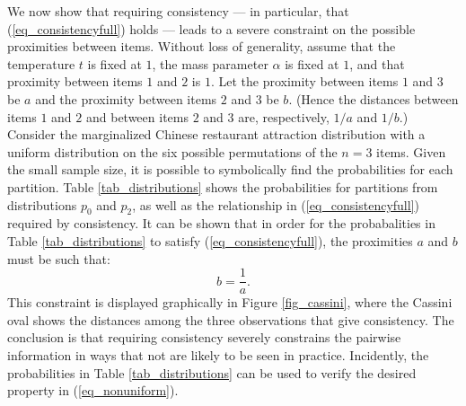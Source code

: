 \documentclass[lineno]{biometrika-dbd}
\newcommand{\mass}{\alpha}
\begin{document}
We now show that requiring consistency --- in particular, that
(\ref{eq_consistencyfull}) holds --- leads to a severe constraint on the
possible proximities between items.  Without loss of generality, assume that
the temperature $t$ is fixed at $1$, the mass parameter $\mass$ is fixed at
$1$, and that proximity between items $1$ and $2$ is $1$. Let the proximity
between items $1$ and $3$ be $a$ and the proximity between items $2$ and $3$ be
$b$.  (Hence the distances between items $1$ and $2$ and between items $2$ and
$3$ are, respectively, $1/a$ and $1/b$.) Consider the marginalized Chinese
restaurant attraction distribution with a uniform distribution on the six
possible permutations of the $n=3$ items.  Given the small sample size, it is
possible to symbolically find the probabilities for each partition.  Table
\ref{tab_distributions} shows the probabilities for partitions from
distributions $p_0$ and $p_2$, as well as the relationship in
(\ref{eq_consistencyfull}) required by consistency.  It can be shown that in
order for the probabalities in Table \ref{tab_distributions} to satisfy
(\ref{eq_consistencyfull}), the proximities $a$ and $b$ must be such that:
\begin{equation}
\label{eq_constraint}
b = \frac{1}{a}.
\end{equation}
This constraint is displayed graphically in Figure \ref{fig_cassini}, where the
Cassini oval shows the distances among the three observations that give
consistency.  The conclusion is that requiring consistency severely constrains
the pairwise information in ways that not are likely to be seen in practice.
Incidently, the probabilities in Table \ref{tab_distributions} can be used to
verify the desired property in (\ref{eq_nonuniform}).
\end{document}
